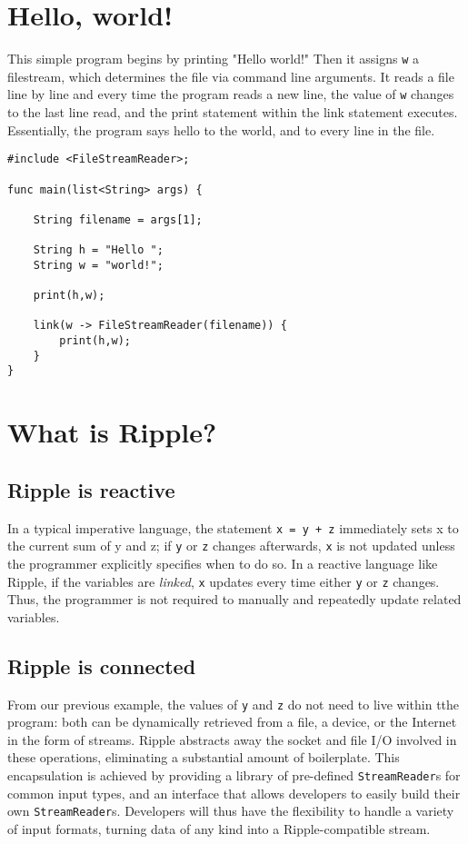 \documentclass{article}
\newcommand{\code}{\texttt}
\begin{document}
\section*{Hello, world!}
This simple program begins by printing "Hello world!" Then it assigns
\code{w} a filestream, which determines the file via command line arguments. It
reads a file line by line and every time the program reads a new line, the value
of \code{w} changes to the last line read, and the print statement within the
link statement executes. Essentially, the program says hello to the world, and
to every line in the file.
\begin{lstlisting}[title=\emph{hello.rpl}]
#include <FileStreamReader>;

func main(list<String> args) {

    String filename = args[1];

    String h = "Hello ";
    String w = "world!";

    print(h,w);

    link(w -> FileStreamReader(filename)) {
        print(h,w);
    }
}
\end{lstlisting}

\section*{What is Ripple?}

\subsection*{Ripple is reactive}
In a typical imperative language, the statement \code{x = y + z} immediately
sets x to the current sum of y and z; if \code{y} or \code{z} changes
afterwards, \code{x} is not updated unless the programmer explicitly specifies
when to do so. In a reactive language like Ripple, if the variables are
\emph{linked}, \code{x} updates every time either \code{y} or \code{z} changes.
Thus, the programmer is not required to manually and repeatedly update related
variables.

\subsection*{Ripple is connected}
From our previous example, the values of \code{y} and \code{z} do not need to live within tthe program: both can be dynamically retrieved from a file, a device, or the
Internet in the form of streams. Ripple abstracts away the socket and file I/O
involved in these operations, eliminating a substantial amount of boilerplate.
This encapsulation is achieved by providing a library of pre-defined \code{StreamReader}s for common input types, and an interface that allows developers to easily build their own \code{StreamReader}s. Developers will thus have the flexibility to handle a variety of input formats, turning data of any kind into a Ripple-compatible stream.
\end{document}
